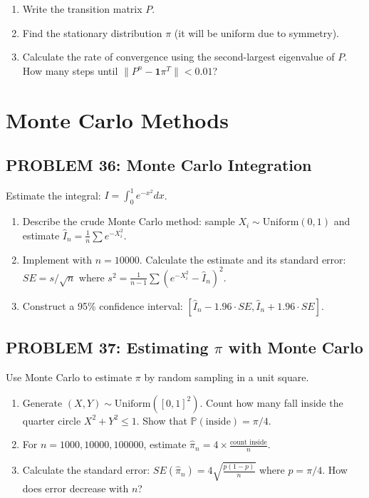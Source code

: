 \documentclass[12pt]{article}
\begin{document}
\begin{enumerate}
\item[(a)] Write the transition matrix \(P\).
\item[(b)] Find the stationary distribution \(\pi\) (it will be uniform due to symmetry).
\item[(c)] Calculate the rate of convergence using the second-largest eigenvalue of \(P\). How many steps until \(\|P^n - \mathbf{1}\pi^T\| < 0.01\)?
\end{enumerate}

\newpage
\section*{Monte Carlo Methods}

\subsection*{PROBLEM 36: Monte Carlo Integration}

Estimate the integral: \(I = \int_0^1 e^{-x^2} dx\).

\begin{enumerate}
\item[(a)] Describe the crude Monte Carlo method: sample \(X_i \sim \text{Uniform}(0,1)\) and estimate \(\hat{I}_n = \frac{1}{n}\sum e^{-X_i^2}\).
\item[(b)] Implement with \(n = 10000\). Calculate the estimate and its standard error: \(SE = s/\sqrt{n}\) where \(s^2 = \frac{1}{n-1}\sum(e^{-X_i^2} - \hat{I}_n)^2\).
\item[(c)] Construct a 95\% confidence interval: \([\hat{I}_n - 1.96 \cdot SE, \hat{I}_n + 1.96 \cdot SE]\).
\end{enumerate}

\subsection*{PROBLEM 37: Estimating \(\pi\) with Monte Carlo}

Use Monte Carlo to estimate \(\pi\) by random sampling in a unit square.

\begin{enumerate}
\item[(a)] Generate \((X, Y) \sim \text{Uniform}([0,1]^2)\). Count how many fall inside the quarter circle \(X^2 + Y^2 \leq 1\). Show that \(\mathbb{P}(\text{inside}) = \pi/4\).
\item[(b)] For \(n = 1000, 10000, 100000\), estimate \(\hat{\pi}_n = 4 \times \frac{\text{count inside}}{n}\).
\item[(c)] Calculate the standard error: \(SE(\hat{\pi}_n) = 4\sqrt{\frac{p(1-p)}{n}}\) where \(p = \pi/4\). How does error decrease with \(n\)?
\end{enumerate}
\end{document}
